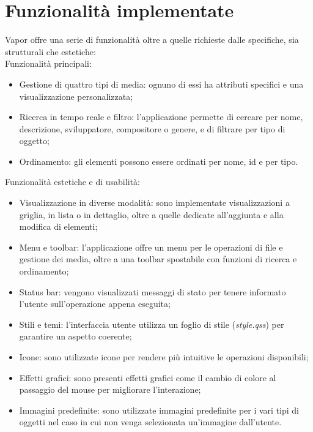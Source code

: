 \documentclass[10pt]{article}
\begin{document}
\section{Funzionalità implementate} \label{funzionalita}
Vapor offre una serie di funzionalità oltre a quelle richieste dalle specifiche, sia strutturali che estetiche:
\\Funzionalità principali:
\begin{itemize}
    \item Gestione di quattro tipi di media: ognuno di essi ha attributi specifici e una visualizzazione personalizzata;
    \item Ricerca in tempo reale e filtro: l'applicazione permette di cercare per nome, descrizione, sviluppatore, compositore o genere, e di filtrare per tipo di oggetto;
    \item Ordinamento: gli elementi possono essere ordinati per nome, id e per tipo.
\end{itemize}
Funzionalità estetiche e di usabilità:
\begin{itemize}
    \item Visualizzazione in diverse modalità: sono implementate visualizzazioni a griglia, in lista o in dettaglio, oltre a quelle dedicate all'aggiunta e alla modifica di elementi;
    \item Menu e toolbar: l'applicazione offre un menu per le operazioni di file e gestione dei media, oltre a una toolbar spostabile con funzioni di ricerca e ordinamento;
    \item Status bar: vengono visualizzati messaggi di stato per tenere informato l'utente sull'operazione appena eseguita;
    \item Stili e temi: l'interfaccia utente utilizza un foglio di stile (\textit{style.qss}) per garantire un aspetto coerente;
    \item Icone: sono utilizzate icone per rendere più intuitive le operazioni disponibili;
    \item Effetti grafici: sono presenti effetti grafici come il cambio di colore al passaggio del mouse per migliorare l'interazione;
    \item Immagini predefinite: sono utilizzate immagini predefinite per i vari tipi di oggetti nel caso in cui non venga selezionata un'immagine dall'utente.
\end{itemize}
\end{document}
